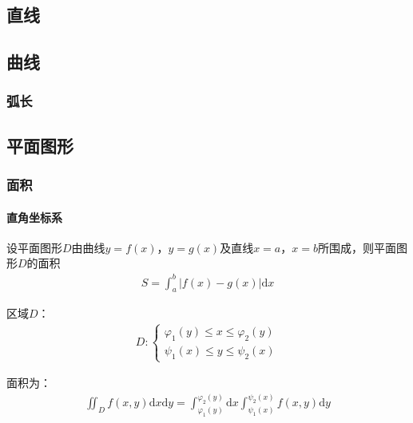 \documentclass[12pt]{book}
\begin{document}
\subsection{直线}


\subsection{曲线}


\subsubsection{弧长}


\subsection{平面图形}






\subsubsection{面积}









\paragraph{直角坐标系}

设平面图形$D$由曲线$y=f(x)$，$y=g(x)$及直线$x=a$，$x=b$所围成，则平面图形$D$的面积
\begin{gather*}
    S=\int_{a}^{b}{|f(x)-g(x)| \mathrm{d}x} 
\end{gather*}


区域$D$：
\begin{gather*}
    D: \begin{cases}
        \varphi_{1}(y)\leqslant x\leqslant\varphi_{2}(y) \\
        \psi_{1}(x)\leqslant y\leqslant \psi_{2}(x)
    \end{cases}
\end{gather*}

面积为：
\begin{gather*}
    \iint_{D}{f(x,y)\mathrm{d}x\mathrm{d}y } 
    = 
    \int_{\varphi_{1}(y)}^{\varphi_{2}(y)}\mathrm{d}x
    \int_{\psi_{1}(x)}^{\psi_{2}(x)}{f(x,y) \mathrm{d}y }
\end{gather*}
\end{document}
